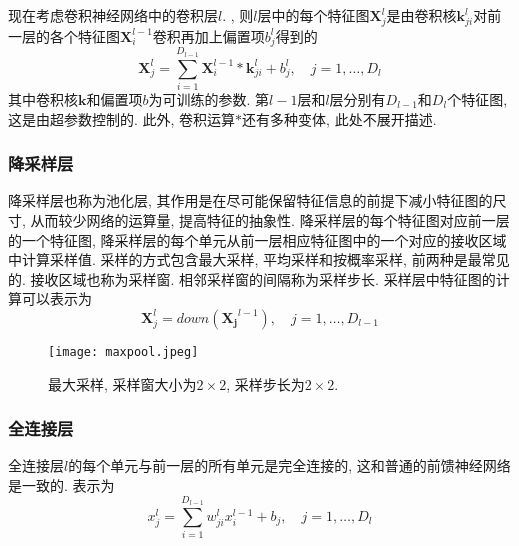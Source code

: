 现在考虑卷积神经网络中的卷积层$l$. , 则$l$层中的每个特征图$\boldsymbol{X}_j^l$是由卷积核$\boldsymbol{k}_{ji}^l$对前一层的各个特征图$\boldsymbol{X}_i^{l-1}$卷积再加上偏置项$b_j^l$得到的
\begin{equation}
    \boldsymbol{X}_j^l = \sum_{i=1}^{D_{l-1}} \boldsymbol{X}_i^{l-1} * \boldsymbol{k}_{ji}^l + b_j^l, \quad j = 1, \dots, D_l
\end{equation}
其中卷积核$\boldsymbol{k}$和偏置项$b$为可训练的参数. 第$l-1$层和$l$层分别有$D_{l-1}$和$D_l$个特征图, 这是由超参数控制的. 此外, 卷积运算$*$还有多种变体, 此处不展开描述.


\subsubsection{降采样层}
降采样层也称为池化层, 其作用是在尽可能保留特征信息的前提下减小特征图的尺寸, 从而较少网络的运算量, 提高特征的抽象性. 降采样层的每个特征图对应前一层的一个特征图, 降采样层的每个单元从前一层相应特征图中的一个对应的接收区域中计算采样值.  采样的方式包含最大采样, 平均采样和按概率采样, 前两种是最常见的. 接收区域也称为采样窗. 相邻采样窗的间隔称为采样步长. 采样层中特征图的计算可以表示为
\begin{equation}
    \boldsymbol{X}_j^l = down(\boldsymbol{X_j}^{l-1}), \quad j = 1, \dots, D_{l-1}
\end{equation}
\begin{figure}[!htbp]
\centering
\texttt{[image: maxpool.jpeg]}
\caption{最大采样, 采样窗大小为$2\times2$, 采样步长为$2\times2$.}
\label{maxpool} 
\end{figure}

\subsubsection{全连接层}
全连接层$l$的每个单元与前一层的所有单元是完全连接的, 这和普通的前馈神经网络是一致的. 表示为
\begin{equation}
    x_j^l = \sum_{i=1}^{D_{l-1}} w_{ji}^l x_i^{l-1} + b_j, \quad j = 1, \dots, D_l
\end{equation}



